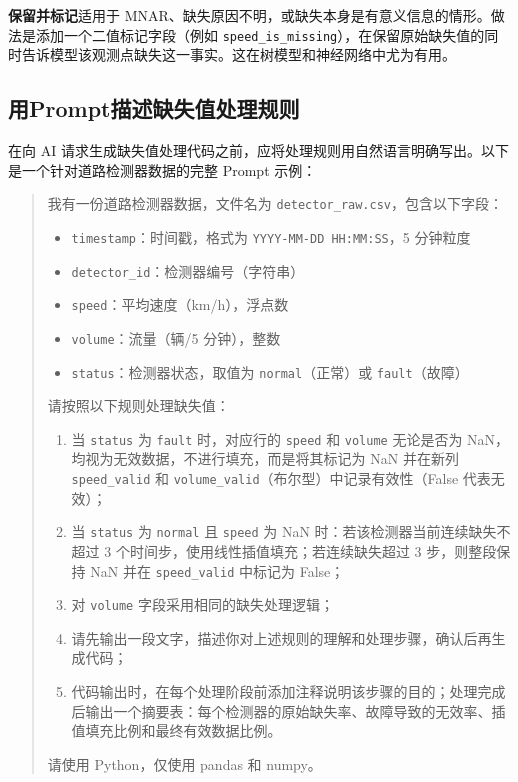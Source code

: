 \textbf{保留并标记}适用于 MNAR、缺失原因不明，或缺失本身是有意义信息的情形。做法是添加一个二值标记字段（例如 \texttt{speed\_is\_missing}），在保留原始缺失值的同时告诉模型该观测点缺失这一事实。这在树模型和神经网络中尤为有用。

\subsection{用Prompt描述缺失值处理规则}

在向 AI 请求生成缺失值处理代码之前，应将处理规则用自然语言明确写出。以下是一个针对道路检测器数据的完整 Prompt 示例：

\begin{quote}
我有一份道路检测器数据，文件名为 \texttt{detector\_raw.csv}，包含以下字段：

\begin{itemize}
  \item \texttt{timestamp}：时间戳，格式为 \texttt{YYYY-MM-DD HH:MM:SS}，5 分钟粒度
  \item \texttt{detector\_id}：检测器编号（字符串）
  \item \texttt{speed}：平均速度（km/h），浮点数
  \item \texttt{volume}：流量（辆/5 分钟），整数
  \item \texttt{status}：检测器状态，取值为 \texttt{normal}（正常）或 \texttt{fault}（故障）
\end{itemize}

请按照以下规则处理缺失值：

\begin{enumerate}
  \item 当 \texttt{status} 为 \texttt{fault} 时，对应行的 \texttt{speed} 和 \texttt{volume} 无论是否为 NaN，均视为无效数据，不进行填充，而是将其标记为 NaN 并在新列 \texttt{speed\_valid} 和 \texttt{volume\_valid}（布尔型）中记录有效性（False 代表无效）；
  \item 当 \texttt{status} 为 \texttt{normal} 且 \texttt{speed} 为 NaN 时：若该检测器当前连续缺失不超过 3 个时间步，使用线性插值填充；若连续缺失超过 3 步，则整段保持 NaN 并在 \texttt{speed\_valid} 中标记为 False；
  \item 对 \texttt{volume} 字段采用相同的缺失处理逻辑；
  \item 请先输出一段文字，描述你对上述规则的理解和处理步骤，确认后再生成代码；
  \item 代码输出时，在每个处理阶段前添加注释说明该步骤的目的；处理完成后输出一个摘要表：每个检测器的原始缺失率、故障导致的无效率、插值填充比例和最终有效数据比例。
\end{enumerate}

请使用 Python，仅使用 pandas 和 numpy。
\end{quote}

